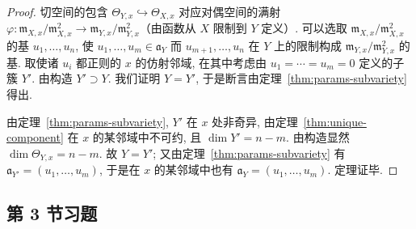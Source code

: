 \begin{proof}
	切空间的包含 $\Theta_{Y,x} \hookrightarrow \Theta_{X,x}$ 对应对偶空间的满射 $\varphi: \mathfrak m_{X,x}/\mathfrak m_{X,x}^2 \to \mathfrak m_{Y,x}/\mathfrak m_{Y,x}^2$（由函数从 $X$ 限制到 $Y$ 定义）. 可以选取 $\mathfrak m_{X,x}/\mathfrak m_{X,x}^2$ 的基 $u_1, \ldots, u_n$, 使 $u_1, \ldots, u_m \in \mathfrak a_Y$ 而 $u_{m+1}, \ldots, u_n$ 在 $Y$ 上的限制构成 $\mathfrak m_{Y,x}/\mathfrak m_{Y,x}^2$ 的基. 取使诸 $u_i$ 都正则的 $x$ 的仿射邻域, 在其中考虑由 $u_1 = \cdots = u_m = 0$ 定义的子簇 $Y'$. 由构造 $Y' \supset Y$. 我们证明 $Y = Y'$, 于是断言由定理~\ref{thm:params-subvariety} 得出.

	由定理~\ref{thm:params-subvariety}, $Y'$ 在 $x$ 处非奇异, 由定理~\ref{thm:unique-component} 在 $x$ 的某邻域中不可约, 且 $\dim Y' = n - m$. 由构造显然 $\dim \Theta_{Y,x} = n - m$. 故 $Y = Y'$; 又由定理~\ref{thm:params-subvariety} 有 $\mathfrak a_{Y'} = (u_1, \ldots, u_m)$, 于是在 $x$ 的某邻域中也有 $\mathfrak a_Y = (u_1, \ldots, u_m)$. 定理证毕.
\end{proof}

\subsection{第 3 节习题}

